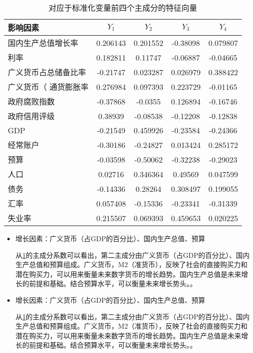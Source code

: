 \documentclass[withoutpreface,bwprint]{cumcmthesis} %
\begin{document}
\begin{itemize}
	\begin{table}[h]
		\centering
		\caption{对应于标准化变量前四个主成分的特征向量}
		\label{tab5}
		\begin{tabular}{lcccc}
			\toprule[1.5pt]
			影响因素 & \(Y_1\) & \(Y_2\) & \(Y_3\) & \(Y_4\) \\ 
			\midrule[1pt]
			国内生产总值增长率 & 0.206143 & 0.201552 & -0.38098 & 0.079807 \\
			利率 & 0.182811 & 0.11747 & -0.06887 & -0.04665 \\
			广义货币占总储备比率 & -0.21747 & 0.023287 & 0.026979 & 0.388422 \\
			广义货币（%
			通货膨胀率 & 0.276984 & 0.097393 & 0.223729 & -0.01165 \\
			政府腐败指数 & -0.37868 & -0.0355 & 0.126894 & -0.16746 \\
			政府信用评级 & 0.38939 & -0.08538 & -0.12208 & -0.12838 \\
			GDP & -0.21549 & 0.459926 & -0.23584 & -0.24366 \\
			经常账户 & -0.30186 & -0.24827 & 0.013424 & 0.285172 \\
			预算 & -0.03598 & -0.50062 & -0.32238 & -0.29023 \\
			人口 & 0.02716 & 0.346364 & 0.49569 & 0.047599 \\
			债务 & -0.14336 & 0.28264 & 0.308497 & 0.199055 \\
			汇率 & 0.057408 & -0.15336 & -0.23341 & -0.31339 \\
			失业率 & 0.215507 & 0.069393 & 0.459653 & 0.020225 \\ 
			\bottomrule[1.5pt]
		\end{tabular}
	\end{table}
	
\end{itemize}

\begin{itemize}
	\item 增长因素：广义货币（占GDP的百分比）、国内生产总值、预算
	
	从\ref{tab5}的主成分系数可以看出，第二主成分由广义货币（占GDP的百分比）、国内生产总值和预算组成。广义货币，M2（准货币），反映了社会的直接购买力和潜在购买力，可以用来衡量未来数字货币的增长趋势。国内生产总值是未来增长的前提和基础。结合预算水平，可以衡量未来增长势头。。
\end{itemize}

\begin{itemize}
	\item 增长因素：广义货币（占GDP的百分比）、国内生产总值、预算
	
	从\ref{tab5}的主成分系数可以看出，第二主成分由广义货币（占GDP的百分比）、国内生产总值和预算组成。广义货币，M2（准货币），反映了社会的直接购买力和潜在购买力，可以用来衡量未来数字货币的增长趋势。国内生产总值是未来增长的前提和基础。结合预算水平，可以衡量未来增长势头。。
\end{itemize}
\end{document}
